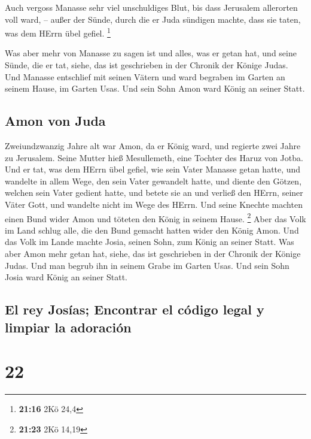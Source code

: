  Auch vergoss Manasse sehr viel unschuldiges Blut, bis
dass Jerusalem allerorten voll ward, -- außer der Sünde, durch die er
Juda sündigen machte, dass sie taten, was dem HErrn übel gefiel.
\footnote{\textbf{21:16} 2Kö 24,4}

 Was aber mehr von Manasse zu sagen ist und alles, was er
getan hat, und seine Sünde, die er tat, siehe, das ist geschrieben in
der Chronik der Könige Judas.  Und Manasse entschlief mit
seinen Vätern und ward begraben im Garten an seinem Hause, im Garten
Usas. Und sein Sohn Amon ward König an seiner Statt.

\hypertarget{amon-von-juda}{%
\subsection{Amon von Juda}\label{amon-von-juda}}

 Zweiundzwanzig Jahre alt war Amon, da er König ward, und
regierte zwei Jahre zu Jerusalem. Seine Mutter hieß Mesullemeth, eine
Tochter des Haruz von Jotba.  Und er tat, was dem HErrn
übel gefiel, wie sein Vater Manasse getan hatte,  und
wandelte in allem Wege, den sein Vater gewandelt hatte, und diente den
Götzen, welchen sein Vater gedient hatte, und betete sie an
 und verließ den HErrn, seiner Väter Gott, und wandelte
nicht im Wege des HErrn.  Und seine Knechte machten einen
Bund wider Amon und töteten den König in seinem Hause. \footnote{\textbf{21:23}
  2Kö 14,19}  Aber das Volk im Land schlug alle, die den
Bund gemacht hatten wider den König Amon. Und das Volk im Lande machte
Josia, seinen Sohn, zum König an seiner Statt.  Was aber
Amon mehr getan hat, siehe, das ist geschrieben in der Chronik der
Könige Judas.  Und man begrub ihn in seinem Grabe im
Garten Usas. Und sein Sohn Josia ward König an seiner Statt.

\hypertarget{el-rey-josuxedas-encontrar-el-cuxf3digo-legal-y-limpiar-la-adoraciuxf3n}{%
\subsection{El rey Josías; Encontrar el código legal y limpiar la
adoración}\label{el-rey-josuxedas-encontrar-el-cuxf3digo-legal-y-limpiar-la-adoraciuxf3n}}

\hypertarget{section-21}{%
\section{22}\label{section-21}}

